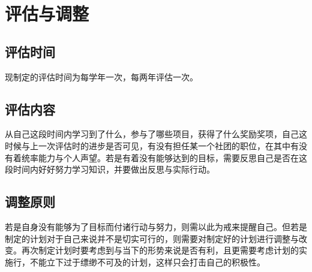 \documentclass{article}
\begin{document}
\section{评估与调整}
\subsection{评估时间}
现制定的评估时间为每学年一次，每两年评估一次。
\subsection{评估内容}

从自己这段时间内学习到了什么，参与了哪些项目，获得了什么奖励奖项，自己这时候与上一次评估时的进步是否可见，有没有担任某一个社团的职位，在其中有没有着统率能力与个人声望。若是有着没有能够达到的目标，需要反思自己是否在这段时间内好好努力学习知识，并要做出反思与实际行动。
\subsection{调整原则}
若是自身没有能够为了目标而付诸行动与努力，则需以此为戒来提醒自己。但若是制定的计划对于自己来说并不是切实可行的，则需要对制定好的计划进行调整与改变。再次制定计划时要考虑到与当下的形势来说是否有利，且更需要考虑计划的实施行，不能立下过于缥缈不可及的计划，这样只会打击自己的积极性。
\end{document}

